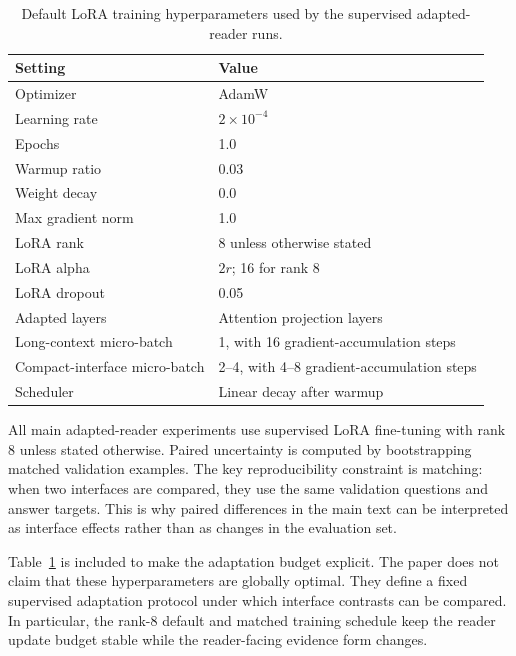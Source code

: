 \documentclass[a4paper,fleqn]{cas-sc}
\begin{document}
\begin{table}[!hbp]
\centering
\caption{Default LoRA training hyperparameters used by the supervised
adapted-reader runs.}
\label{tab:appendix-lora-hparams}
\scriptsize
\setlength{\tabcolsep}{4pt}
\begin{tabular}{ll}
\toprule
Setting & Value \\
\midrule
Optimizer & AdamW \\
Learning rate & $2\times 10^{-4}$ \\
Epochs & 1.0 \\
Warmup ratio & 0.03 \\
Weight decay & 0.0 \\
Max gradient norm & 1.0 \\
LoRA rank & 8 unless otherwise stated \\
LoRA alpha & $2r$; 16 for rank 8 \\
LoRA dropout & 0.05 \\
Adapted layers & Attention projection layers \\
Long-context micro-batch & 1, with 16 gradient-accumulation steps \\
Compact-interface micro-batch & 2--4, with 4--8 gradient-accumulation steps \\
Scheduler & Linear decay after warmup \\
\bottomrule
\end{tabular}
\end{table}

All main adapted-reader experiments use supervised LoRA fine-tuning with rank
8 unless stated otherwise. Paired uncertainty is computed by bootstrapping
matched validation examples.
The key reproducibility constraint is matching: when two interfaces are
compared, they use the same validation questions and answer targets. This is why
paired differences in the main text can be interpreted as interface effects
rather than as changes in the evaluation set.

Table~\ref{tab:appendix-lora-hparams} is included to make the adaptation budget
explicit. The paper does not claim that these hyperparameters are globally
optimal. They define a fixed supervised adaptation protocol under which
interface contrasts can be compared. In particular, the rank-8 default and
matched training schedule keep the reader update budget stable while the
reader-facing evidence form changes.
\end{document}
